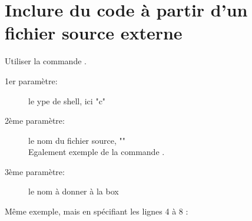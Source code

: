 \section{Inclure du code à partir d'un fichier source externe}

Utiliser la commande .
\begin{description}
	\item[1er paramètre:] le ype de shell, ici "c"
	\item[2ème paramètre:] le nom du fichier source, ""\\ Egalement exemple de la commande .
	\item[3ème paramètre:] le nom à donner à la box
\end{description}



Même exemple, mais en spécifiant les lignes 4 à 8 :



